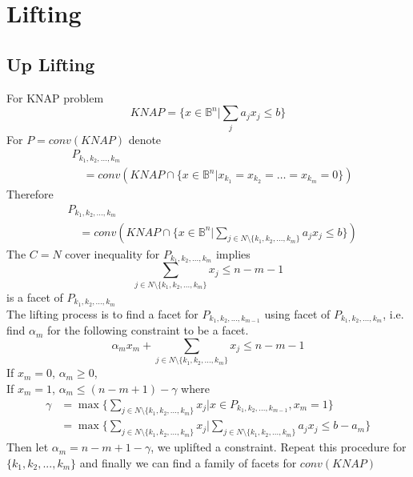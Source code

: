 		\section{Lifting}
			\subsection{Up Lifting}
				For KNAP problem
				\begin{equation}
					KNAP = \{x\in \mathbb{B}^n | \sum_j a_jx_j \le b\} 
				\end{equation}
				For $P=conv(KNAP)$ denote\\
				\begin{align}
					&P_{k_1, k_2, ..., k_m} \\
					&\quad =conv(KNAP\cap \{x\in \mathbb{B}^{n}|x_{k_1}=x_{k_2}=\dots=x_{k_m}=0\}) 
				\end{align}
				Therefore
				\begin{align}
					&P_{k_1, k_2, ..., k_m} \\
					&\quad=conv(KNAP\cap \{x\in \mathbb{B}^{n}|\sum_{j\in N\setminus \{k_1, k_2, ..., k_m\}} a_j x_j \le b\}) 
				\end{align}
				The $C=N$ cover inequality for $P_{k_1, k_2, ..., k_m}$ implies
				\begin{equation}
					\sum_{j\in N\setminus \{k_1, k_2, ..., k_m\}} x_j \le n-m-1 
				\end{equation}
				is a facet of $P_{k_1, k_2, ..., k_m}$\\
				The lifting process is to find a facet for $P_{k_1, k_2, ..., k_{m-1}}$ using facet of $P_{k_1, k_2, ..., k_m}$, i.e. find $\alpha_{m}$ for the following constraint to be a facet.
				\begin{equation}
					\alpha_m x_m + \sum_{j\in N\setminus \{k_1, k_2, ..., k_m\}} x_j \le n-m-1 
				\end{equation}
				If $x_m=0$, $\alpha_m \ge 0$,\\
				If $x_m=1$, $\alpha_m \le (n-m+1) - \gamma$ where
				\begin{align}
					\gamma &= \max\{\sum_{j\in N\setminus\{k_1, k_2, ..., k_m\}}x_j|x\in P_{k_1, k_2, ..., k_{m-1}}, x_m=1\} \\
					&= \max\{\sum_{j\in N\setminus\{k_1, k_2, ..., k_m\}}x_j|\sum_{j \in N \setminus \{k_1, k_2, ..., k_m\}}a_jx_j\le b-a_m\} 
				\end{align}
				Then let $\alpha_m = n-m+1-\gamma$, we uplifted a constraint. Repeat this procedure for $\{k_1, k_2, ..., k_m\}$ and finally we can find a family of facets for $conv(KNAP)$


